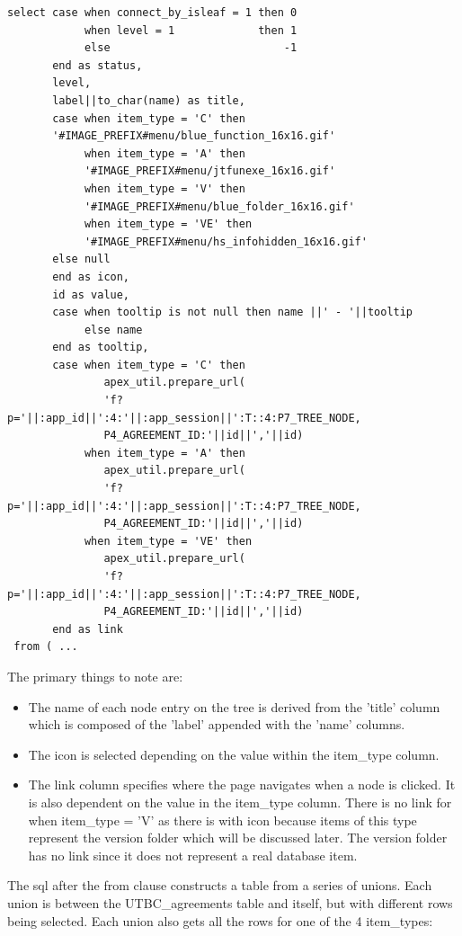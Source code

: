 \documentclass{report}
\begin{document}
\begin{lstlisting}[caption=Agreement tree select statement]
select case when connect_by_isleaf = 1 then 0
            when level = 1             then 1
            else                           -1
       end as status, 
       level,
       label||to_char(name) as title, 
       case when item_type = 'C' then 
       '#IMAGE_PREFIX#menu/blue_function_16x16.gif' 
            when item_type = 'A' then 
            '#IMAGE_PREFIX#menu/jtfunexe_16x16.gif'
            when item_type = 'V' then 
            '#IMAGE_PREFIX#menu/blue_folder_16x16.gif'
            when item_type = 'VE' then 
            '#IMAGE_PREFIX#menu/hs_infohidden_16x16.gif'
       else null
       end as icon, 
       id as value, 
       case when tooltip is not null then name ||' - '||tooltip
            else name
       end as tooltip,
       case when item_type = 'C' then 
               apex_util.prepare_url(
               'f?p='||:app_id||':4:'||:app_session||':T::4:P7_TREE_NODE,
               P4_AGREEMENT_ID:'||id||','||id)
            when item_type = 'A' then
               apex_util.prepare_url(
               'f?p='||:app_id||':4:'||:app_session||':T::4:P7_TREE_NODE,
               P4_AGREEMENT_ID:'||id||','||id)
            when item_type = 'VE' then 
               apex_util.prepare_url(
               'f?p='||:app_id||':4:'||:app_session||':T::4:P7_TREE_NODE,
               P4_AGREEMENT_ID:'||id||','||id)
       end as link 
 from ( ...
\end{lstlisting}

The primary things to note are:
\begin{itemize}
	\item The name of each node entry on the tree is derived from the 'title' column which is composed of the 'label' appended with the 'name' columns.
  \item The icon is selected depending on the value within the item\_type column.
  \item The link column specifies where the page navigates when a node is clicked.  It is also dependent on the value in the item\_type column.  There is no link for when item\_type = 'V' as there is with icon because items of this type represent the version folder which will be discussed later.  The version folder has no link since it does not represent a real database item.
\end{itemize}
The sql after the from clause constructs a table from a series of unions.  Each union is between the UTBC\_agreements table and itself, but with different rows being selected.  Each union also gets all the rows for one of the 4 item\_types: 
\end{document}
